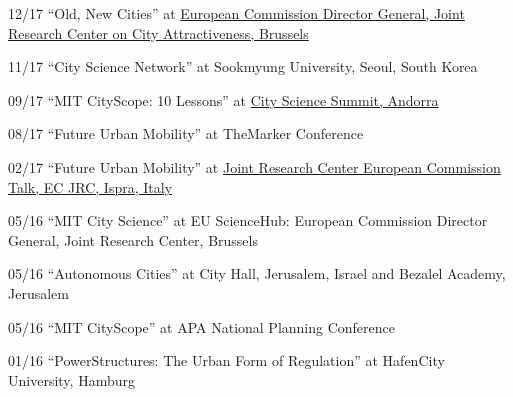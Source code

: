 \begin{tablist}
    \item[12/17] \tab \enquote{Old, New Cities} at \href{https://www.youtube.com/watch?v=AW-ljDEleLw}{European Commission Director General, Joint Research Center on City Attractiveness, Brussels}

    \item[11/17] \tab \enquote{City Science Network} at {Sookmyung University, Seoul, South Korea}

    \item[09/17] \tab \enquote{MIT CityScope: 10 Lessons} at \href{https://www.youtube.com/watch?v=bRNbap13I5w}{City Science Summit, Andorra}


    \item[08/17] \tab \enquote{Future Urban Mobility} at {TheMarker Conference}

    \item[02/17] \tab \enquote{Future Urban Mobility} at \href{https://ec.europa.eu/jrc/en/event/conference/14th-jrc-annual-training-composite-indicators-and-scoreboards} {Joint Research Center European Commission Talk, EC JRC, Ispra, Italy}

    \item[05/16] \tab \enquote{MIT City Science} at {EU ScienceHub:
        European Commission Director General, Joint Research Center, Brussels}

    \item[05/16] \tab \enquote{Autonomous Cities} at {City Hall, Jerusalem, Israel and Bezalel Academy, Jerusalem}


    \item[05/16] \tab \enquote{MIT CityScope} at {APA National Planning Conference}

    \item[01/16] \tab \enquote{PowerStructures: The Urban Form of Regulation} at {HafenCity University, Hamburg}

\end{tablist}

